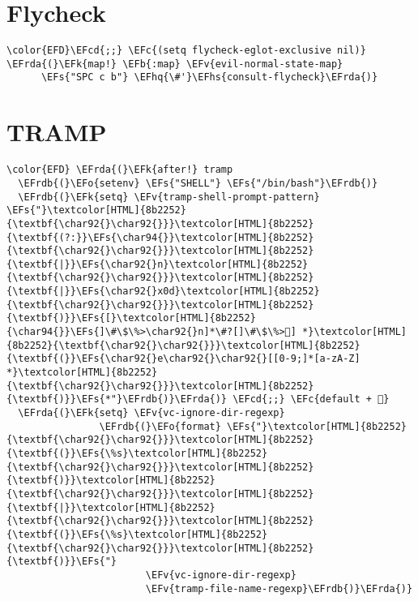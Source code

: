 \documentclass[12pt]{article}
\theoremstyle{plain}%
\theoremstyle{definition}
\theoremstyle{remark}
\newcommand{\EFc}[1]{\textcolor{EFc}{#1}} %
\newcommand{\EFcd}[1]{\textcolor{EFcd}{#1}} %
\newcommand{\EFs}[1]{\textcolor{EFs}{#1}} %
\newcommand{\EFk}[1]{\textcolor{EFk}{#1}} %
\newcommand{\EFb}[1]{\textcolor{EFb}{#1}} %
\newcommand{\EFv}[1]{\textcolor{EFv}{#1}} %
\newcommand{\EFo}[1]{\textcolor{EFo}{#1}} %
\newcommand{\EFhq}[1]{\textcolor{EFhq}{#1}} %
\newcommand{\EFhs}[1]{\textcolor{EFhs}{#1}} %
\newcommand{\EFrda}[1]{\textcolor{EFrda}{#1}} %
\newcommand{\EFrdb}[1]{\textcolor{EFrdb}{#1}} %
\begin{document}
\section{Flycheck}
\label{sec:org45538c8}
\begin{Code}
\begin{Verbatim}
\color{EFD}\EFcd{;;} \EFc{(setq flycheck-eglot-exclusive nil)}
\EFrda{(}\EFk{map!} \EFb{:map} \EFv{evil-normal-state-map}
      \EFs{"SPC c b"} \EFhq{\#'}\EFhs{consult-flycheck}\EFrda{)}
\end{Verbatim}
\end{Code}
\section{TRAMP}
\label{sec:orgedf6cda}
\begin{Code}
\begin{Verbatim}
\color{EFD} \EFrda{(}\EFk{after!} tramp
  \EFrdb{(}\EFo{setenv} \EFs{"SHELL"} \EFs{"/bin/bash"}\EFrdb{)}
  \EFrdb{(}\EFk{setq} \EFv{tramp-shell-prompt-pattern} \EFs{"}\textcolor[HTML]{8b2252}{\textbf{\char92{}\char92{}}}\textcolor[HTML]{8b2252}{\textbf{(?:}}\EFs{\char94{}}\textcolor[HTML]{8b2252}{\textbf{\char92{}\char92{}}}\textcolor[HTML]{8b2252}{\textbf{|}}\EFs{\char92{}n}\textcolor[HTML]{8b2252}{\textbf{\char92{}\char92{}}}\textcolor[HTML]{8b2252}{\textbf{|}}\EFs{\char92{}x0d}\textcolor[HTML]{8b2252}{\textbf{\char92{}\char92{}}}\textcolor[HTML]{8b2252}{\textbf{)}}\EFs{[}\textcolor[HTML]{8b2252}{\char94{}}\EFs{]\#\$\%>\char92{}n]*\#?[]\#\$\%>] *}\textcolor[HTML]{8b2252}{\textbf{\char92{}\char92{}}}\textcolor[HTML]{8b2252}{\textbf{(}}\EFs{\char92{}e\char92{}\char92{}[[0-9;]*[a-zA-Z] *}\textcolor[HTML]{8b2252}{\textbf{\char92{}\char92{}}}\textcolor[HTML]{8b2252}{\textbf{)}}\EFs{*"}\EFrdb{)}\EFrda{)} \EFcd{;;} \EFc{default + }
  \EFrda{(}\EFk{setq} \EFv{vc-ignore-dir-regexp}
                \EFrdb{(}\EFo{format} \EFs{"}\textcolor[HTML]{8b2252}{\textbf{\char92{}\char92{}}}\textcolor[HTML]{8b2252}{\textbf{(}}\EFs{\%s}\textcolor[HTML]{8b2252}{\textbf{\char92{}\char92{}}}\textcolor[HTML]{8b2252}{\textbf{)}}\textcolor[HTML]{8b2252}{\textbf{\char92{}\char92{}}}\textcolor[HTML]{8b2252}{\textbf{|}}\textcolor[HTML]{8b2252}{\textbf{\char92{}\char92{}}}\textcolor[HTML]{8b2252}{\textbf{(}}\EFs{\%s}\textcolor[HTML]{8b2252}{\textbf{\char92{}\char92{}}}\textcolor[HTML]{8b2252}{\textbf{)}}\EFs{"}
                        \EFv{vc-ignore-dir-regexp}
                        \EFv{tramp-file-name-regexp}\EFrdb{)}\EFrda{)}
\end{Verbatim}
\end{Code}
\end{document}
